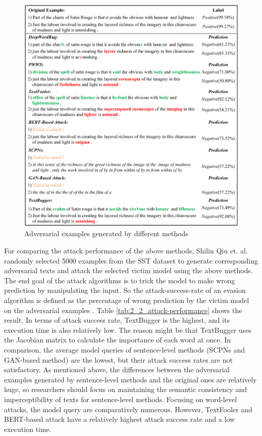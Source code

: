 \begin{figure}[H]
  \centering
  \includegraphics[width=0.9\linewidth]{images/2_2_adversarial_examples.png}
  \caption{Adversarial examples generated by different methods \cite{QIU2022278}}
  \label{fig:2_2_adversarial_examples}
\end{figure}

For comparing the attack performance of the above methods, Shilin Qiu et. al. \cite{QIU2022278} randomly selected 5000 examples from the SST dataset to generate corresponding adversarial texts and attack the selected victim model using the above methods. 
The end goal of the attack algorithms is to trick
the model to make wrong prediction by manipulating the input. So the \gls{attack-success-rate} of an evasion algorithm is defined as
the percentage of wrong prediction by the victim model on the adversarial examples \cite{conf/acl-wnlp/TsaiYC19}.
Table \ref{tab:2_2_attack-performance} shows the result.
In terms of attack success rate, TextBugger is the highest, and its execution time is also relatively low. The reason might be that TextBugger uses the Jacobian matrix to calculate the importance of each word at once. In comparison, the average model queries of sentence-level methods (SCPNs and GAN-based method) are the lowest, but their attack success rates are not satisfactory. As mentioned above, the differences between the adversarial examples generated by sentence-level methods and the original ones are relatively huge, so researchers should focus on maintaining the semantic consistency and imperceptibility of texts for sentence-level methods.
Focusing on word-level attacks, the model query are comparatively numerous. However, TextFooler and BERT-based attack have a relatively highest attack success rate and a low execution time. 

